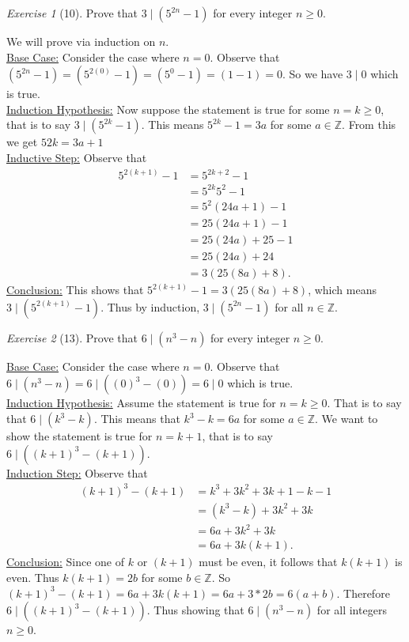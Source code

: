 \documentclass[12pt]{amsart}
\makeatletter
\theoremstyle{remark}
\newtheorem*{exercise}{Exercise}%
\def\ZZ{\ensuremath{\mathbb Z}}
\renewenvironment{proof}[1][\proofname]{\par\doublespacing
  \pushQED{\qed}%
  \normalfont \topsep6\p@\@plus6\p@\relax
  \list{}{%
    \settowidth{\leftmargin}{\itshape\proofname:\hskip\labelsep}%
    \setlength{\labelwidth}{0pt}%
    \setlength{\itemindent}{-\leftmargin}%
  }%
  \item[\hskip\labelsep\itshape#1\@addpunct{:}]\ignorespaces
}{%
  \popQED\endlist\@endpefalse
  \singlespacing
}
\theoremstyle{mycomment}
\makeatother
\begin{document}
\begin{exercise}[10] Prove that $3\mid(5^{2n}-1)$ for every integer $n\ge 0$.
\begin{proof}
  We will prove via induction on $n$. \\
  \underline{Base Case:} Consider the case where $n=0$. Observe that $(5^{2n} -1) = (5^{2(0)} - 1) =( 5^0 - 1) =( 1 - 1) = 0$. So we have $3 \mid 0$ which is true.  \\
  \underline{Induction Hypothesis:} Now suppose the statement is true for some $n = k \geq 0$, that is to say $ 3 \mid (5^{2k} - 1)$. This means $5^{2k} - 1 = 3a  $ for some $a \in \ZZ$. From this we get $5{2k} = 3a + 1$ \\
  \underline{Inductive Step:} Observe that
  \begin{align*}
    5^{2(k+1)}-1 &= 5^{2k+2} - 1 \\
                 &= 5^{2k}5^{2} - 1 \\
                 &= 5^2(24a + 1) - 1 \\
                 &= 25(24a + 1) - 1 \\
                 &= 25(24a) + 25 - 1 \\
                 &= 25(24a) + 24 \\
                 &= 3(25(8a) + 8).
  \end{align*}
  \underline{Conclusion:} This shows that $5^{2(k+1)} - 1 = 3(25(8a) + 8)$, which means $3 \mid (5^{2(k+1)} - 1)$. Thus by induction, $3 \mid (5^{2n} - 1)$ for all $n \in \ZZ$.
\end{proof}
\end{exercise}

\begin{exercise}[13] Prove that $6\mid(n^{3}-n)$ for every integer $n\ge 0$.
\begin{proof}
  \underline{Base Case:} Consider the case where $n = 0$. Observe that $6\mid(n^{3}-n) = 6\mid((0)^3 - (0)) = 6 \mid 0$ which is true.  \\
  \underline{Induction Hypothesis:} Assume the statement is true for $n = k \geq 0$. That is to say that $6\mid(k^{3}-k)$. This means that $k^3 - k = 6a$ for some $a \in \ZZ$. We want to show the statement is true for $n = k + 1$, that is to say $6 \mid ((k+1)^3 - (k+1))$.\\
  \underline{Induction Step:} Observe that
  \begin{align*}
    (k+1)^3 - (k+1) &= k^3 + 3k^2 + 3k + 1 - k - 1 \\
                    &= (k^3 - k) + 3k^2 + 3k \\
                    &= 6a + 3k^2 + 3k  \\
                    &= 6a + 3k(k+1).
  \end{align*}
  \underline{Conclusion:} Since one of $k$ or $(k+1)$ must be even, it follows that $k(k+1)$ is even. Thus $k(k+1) = 2b$ for some $b \in \ZZ$. So $(k+1)^3 - (k+1) = 6a + 3k(k+1) = 6a + 3*2b = 6(a+b)$. Therefore $6 \mid ((k+1)^3 - (k+1))$. Thus showing that $6\mid(n^3 - n)$ for all integers $n\ge 0$.
\end{proof}
\end{exercise}
\end{document}
